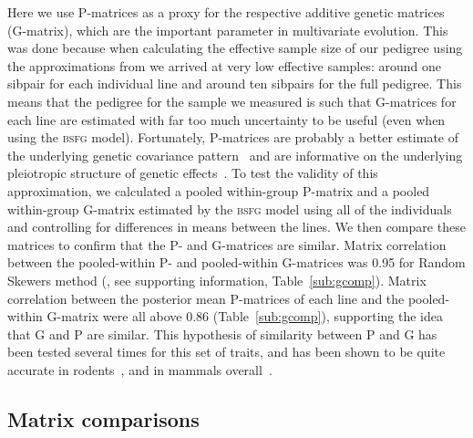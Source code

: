 \begin{refsection}
Here we use P-matrices as a proxy for the respective additive genetic
matrices (G-matrix), which are the important parameter in multivariate
evolution. This was done because when calculating the effective sample
size of our pedigree using the approximations from \textcite{Raffa2016-uh} we arrived
at very low effective samples: around one sibpair for each individual
line and around ten sibpairs for the full pedigree. This means that the
pedigree for the sample we measured is such that G-matrices for each
line are estimated with far too much uncertainty to be useful (even when
using the \textsc{bsfg} model). Fortunately, P-matrices are probably a better
estimate of the underlying genetic covariance
pattern~\parencite{Roff1995-ws, Marroig2012-jd} and are informative on the
underlying pleiotropic structure of genetic
effects~\parencite{Kenney-Hunt2008-bd, Porto2016-qc}. To test the validity of this
approximation, we calculated a pooled within-group P-matrix and a pooled
within-group G-matrix estimated by the \textsc{bsfg} model using all of the
individuals and controlling for differences in means between the lines.
We then compare these matrices to confirm that the P- and G-matrices are
similar. Matrix correlation between the pooled-within P- and
pooled-within G-matrices was 0.95 for Random Skewers method
(\textcite{Cheverud2007-yp}, see supporting information, Table~\ref{sub:gcomp}). Matrix
correlation between the posterior mean P-matrices of each line and the
pooled-within G-matrix were all above 0.86 (Table~\ref{sub:gcomp}), supporting the
idea that G and P are similar. This hypothesis of similarity between P
and G has been tested several times for this set of traits, and has been
shown to be quite accurate in rodents~\parencite{Garcia2014-oj}, and in mammals
overall~\parencite{Cheverud1988-he, Porto2009-pi, Porto2016-qc, Marroig2010-be, Hubbe2016-za, Porto2015-zv}.

\subsection{Matrix comparisons}


\end{refsection}

